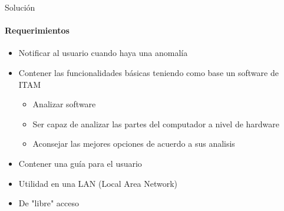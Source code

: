 \begin{frame}{Solución}
    \framesubtitle{Requerimientos}
    \begin{itemize}
        \item Notificar al usuario cuando haya una anomalía
        \item Contener las funcionalidades básicas teniendo como
        base un software de ITAM
        \parencite{invgate}
        \begin{itemize}
            \item Analizar software
            \item Ser capaz de analizar las partes del computador
            a nivel de hardware
            \item Aconsejar las mejores opciones de acuerdo a sus
            analisis
        \end{itemize}
        \item Contener una guía para el usuario
        \item Utilidad en una LAN (Local Area Network)
        \parencite{invgate}
        \item De "libre" acceso \parencite{free}
    \end{itemize}
\end{frame}